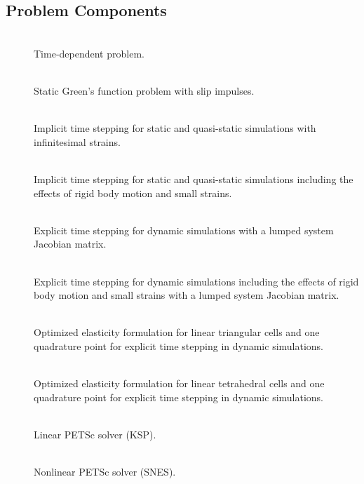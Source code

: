 \subsection{Problem Components}
\begin{description}
\item [] \\
Time-dependent problem.
\item [] \\
Static Green's function problem with slip impulses.
\item [] \\
Implicit time stepping for static and quasi-static simulations with
infinitesimal strains.
\item [] \\
Implicit time stepping for static and quasi-static simulations including
the effects of rigid body motion and small strains.
\item [] \\
Explicit time stepping for dynamic simulations with a lumped system
Jacobian matrix.
\item [] \\
Explicit time stepping for dynamic simulations including the effects
of rigid body motion and small strains with a lumped system Jacobian
matrix.
\item [] \\
Optimized elasticity formulation for linear triangular cells and one
quadrature point for explicit time stepping in dynamic simulations.
\item [] \\
Optimized elasticity formulation for linear tetrahedral cells and
one quadrature point for explicit time stepping in dynamic simulations.
\item [] \\
Linear PETSc solver (KSP).
\item [] \\
Nonlinear PETSc solver (SNES).

\end{description}
